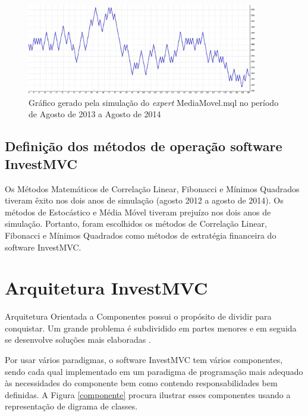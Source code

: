 \begin{figure}[H]
\centering
\includegraphics[width=0.9\textwidth]{figuras/protocoloMedia4}
\caption{ Gráfico gerado pela simulação do \textit{expert} MediaMovel.mql no período de Agosto de 2013 a Agosto de 2014} 
\label{protocoloMedia4}
\end{figure}


\subsection{Definição dos métodos de operação software InvestMVC}

Os Métodos Matemáticos de Correlação Linear, Fibonacci e Mínimos Quadrados tiveram êxito nos dois anos de simulação (agosto 2012 a agosto de 2014). Os métodos de Estocástico e Média Móvel tiveram prejuízo nos dois anos de simulação. Portanto, foram escolhidos os métodos de Correlação Linear, Fibonacci e Mínimos Quadrados como métodos de estratégia financeira do software InvestMVC.

\section{Arquitetura InvestMVC}

Arquitetura Orientada a Componentes possui o propósito de dividir para conquistar. Um grande problema é subdividido em partes menores e em seguida se desenvolve soluções mais elaboradas \cite{john}.

Por usar vários paradigmas, o software InvestMVC tem vários componentes, sendo cada qual implementado em um paradigma de programação mais adequado às necessidades do componente bem como contendo responsabilidades bem definidas. A Figura \ref{componente} procura ilustrar esses componentes usando a representação de digrama de classes.

